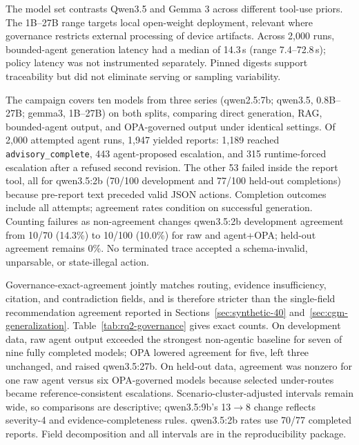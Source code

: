 \documentclass[journal,twoside,web]{ieeecolor}
\newif\ifrqtwotable  \rqtwotabletrue
\begin{document}
The model set contrasts Qwen3.5 and Gemma 3 across different tool-use priors. The 1B--27B range targets local open-weight deployment, relevant where governance restricts external processing of device artifacts. Across 2,000 runs, bounded-agent generation latency had a median of 14.3\,s (range 7.4--72.8\,s); policy latency was not instrumented separately. Pinned digests support traceability but did not eliminate serving or sampling variability.

The campaign covers ten models from three series (qwen2.5:7b; qwen3.5, 0.8B--27B; gemma3, 1B--27B) on both splits, comparing direct generation, RAG, bounded-agent output, and OPA-governed output under identical settings. Of 2,000 attempted agent runs, 1,947 yielded reports: 1,189 reached \texttt{advisory\_complete}, 443 agent-proposed escalation, and 315 runtime-forced escalation after a refused second revision. The other 53 failed inside the report tool, all for qwen3.5:2b (70/100 development and 77/100 held-out completions) because pre-report text preceded valid JSON actions. Completion outcomes include all attempts; agreement rates condition on successful generation. Counting failures as non-agreement changes qwen3.5:2b development agreement from 10/70 (14.3\%) to 10/100 (10.0\%) for raw and agent+OPA; held-out agreement remains 0\%. No terminated trace accepted a schema-invalid, unparsable, or state-illegal action.

Governance-exact-agreement jointly matches routing, evidence insufficiency, citation, and contradiction fields, and is therefore stricter than the single-field recommendation agreement reported in Sections~\ref{sec:synthetic-40} and~\ref{sec:cgm-generalization}.\ifrqtwotable{} Table~\ref{tab:rq2-governance} gives exact counts.\fi{} On development data, raw agent output exceeded the strongest non-agentic baseline for seven of nine fully completed models; OPA lowered agreement for five, left three unchanged, and raised qwen3.5:27b. On held-out data, agreement was nonzero for one raw agent versus six OPA-governed models because selected under-routes became reference-consistent escalations. Scenario-cluster-adjusted intervals remain wide, so comparisons are descriptive; qwen3.5:9b's 13$\to$8 change reflects severity-4 and evidence-completeness rules. qwen3.5:2b rates use 70/77 completed reports. Field decomposition and all intervals are in the reproducibility package.
\end{document}
